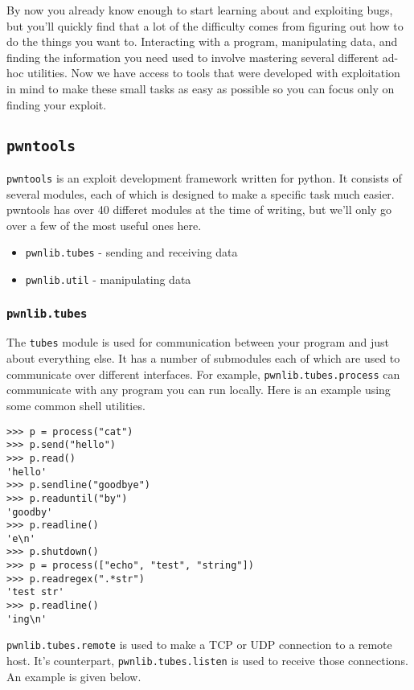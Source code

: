 By now you already know enough to start learning about and exploiting bugs, but
you'll quickly find that a lot of the difficulty comes from figuring out how to
do the things you want to. Interacting with a program, manipulating data, and
finding the information you need used to involve mastering several different
ad-hoc utilities. Now we have access to tools that were developed with
exploitation in mind to make these small tasks as easy as possible so you can
focus only on finding your exploit.

\subsection{\texttt{pwntools}}
\texttt{pwntools} is an exploit development framework written for python. It
consists of several modules, each of which is designed to make a specific task
much easier.  pwntools has over 40 differet modules at the time of writing, but
we'll only go over a few of the most useful ones here.

\begin{itemize}
    \item \texttt{pwnlib.tubes} - sending and receiving data
    \item \texttt{pwnlib.util} - manipulating data
\end{itemize}

\subsubsection{\texttt{pwnlib.tubes}}
The \texttt{tubes} module is used for communication between your program and
just about everything else. It has a number of submodules each of which are used
to communicate over different interfaces. For example,
\texttt{pwnlib.tubes.process} can communicate with any program you can run
locally. Here is an example using some common shell utilities.

\begin{lstlisting}
>>> p = process("cat")
>>> p.send("hello")
>>> p.read()
'hello'
>>> p.sendline("goodbye")
>>> p.readuntil("by")
'goodby'
>>> p.readline()
'e\n'
>>> p.shutdown()
>>> p = process(["echo", "test", "string"]) 
>>> p.readregex(".*str")
'test str'
>>> p.readline()
'ing\n'
\end{lstlisting}

\texttt{pwnlib.tubes.remote} is used to make a TCP or UDP connection to a remote
host. It's counterpart, \texttt{pwnlib.tubes.listen} is used to receive those
connections. An example is given below.

